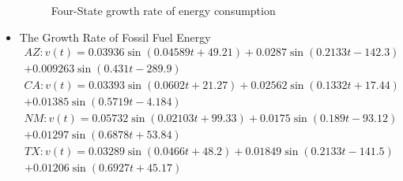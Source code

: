 \documentclass{mcmthesis}
\begin{document}
\begin{itemize}
\begin{figure}[htbp]
		\caption{Four-State growth rate of energy consumption	}                      %
		\label{fig:GrowthRateRenewable}                                       %
	\end{figure}
	\item The Growth Rate of Fossil Fuel Energy\\
	\begin{multline}
	AZ:v(t)=0.03936\sin(0.04589t+49.21)+0.0287\sin(0.2133t-142.3)\\+0.009263\sin(0.431t-289.9)%
	\end{multline}
	\begin{multline}
	CA:v(t)=0.03393\sin(0.0602t+21.27)+0.02562\sin(0.1332t+17.44)\\+0.01385\sin(0.5719t-4.184)%
	\end{multline}
	\begin{multline}
	NM:v(t)=0.05732\sin(0.02103t+99.33)+0.0175\sin(0.189t-93.12)\\+0.01297\sin(0.6878t+53.84)%
	\end{multline}
	\begin{multline}
	TX:v(t)=0.03289\sin(0.0466t+48.2)+0.01849\sin(0.2133t-141.5)\\+0.01206\sin(0.6927t+45.17)%

\end{multline}
\end{itemize}
\end{document}
